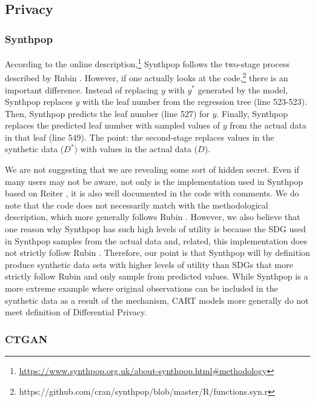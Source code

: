 \documentclass[runningheads]{llncs}
\begin{document}
\subsection{Privacy}

\subsubsection{Synthpop} 

According to the online description,\footnote{\url{https://www.synthpop.org.uk/about-synthpop.html\#methodology}} Synthpop follows the two-stage process described by Rubin \citep{rubin1993statistical}.  However, if one actually looks at the code,\footnote{https://github.com/cran/synthpop/blob/master/R/functions.syn.r} there is an important difference.  Instead of replacing $y$ with $y^*$ generated by the model, Synthpop replaces $y$ with the leaf number from the regression tree (line 523-523).  Then, Synthpop predicts the leaf number (line 527) for $y$.  Finally, Synthpop replaces the predicted leaf number with sampled values of $y$ from the actual data in that leaf (line 549).  The point: the second-stage replaces values in the synthetic data ($D^*)$ with values in the actual data ($D$).  

We are not suggesting that we are revealing some sort of hidden secret.  Even if many users may not be aware, not only is the implementation used in Synthpop based on Reiter \cite{reiter2005using}, it is also well documented in the code with comments.  We do note that the code does not necessarily match with the methodological description, which more generally follows Rubin \cite{rubin1993statistical}.  However, we also believe that one reason why Synthpop has such high levels of utility is because the SDG used in Synthpop samples from the actual data and, related, this implementation does not strictly follow Rubin \cite{rubin1993statistical}.   Therefore, our point is that Synthpop will by definition produce synthetic data sets with higher levels of utility than SDGs that more strictly follow Rubin and only sample from predicted values.  While Synthpop is a more extreme example where original observations can be included in the synthetic data as a result of the mechanism, CART models more generally do not meet definition of Differential Privacy.

\subsubsection{CTGAN}
\end{document}
